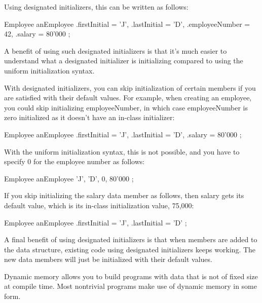 Using designated initializers, this can be written as follows:

\begin{cpp}
Employee anEmployee {
    .firstInitial = 'J',
    .lastInitial = 'D',
    .employeeNumber = 42,
    .salary = 80'000
};
\end{cpp}

A benefit of using such designated initializers is that it’s much easier to understand what a designated initializer is initializing compared to using the uniform initialization syntax.

With designated initializers, you can skip initialization of certain members if you are satisfied with their default values. For example, when creating an employee, you could skip initializing employeeNumber, in which case employeeNumber is zero initialized as it doesn’t have an in-class initializer:

\begin{cpp}
Employee anEmployee {
    .firstInitial = 'J',
    .lastInitial = 'D',
    .salary = 80'000
};
\end{cpp}

With the uniform initialization syntax, this is not possible, and you have to specify 0 for the employee number as follows:

\begin{cpp}
Employee anEmployee { 'J', 'D', 0, 80'000 };
\end{cpp}

If you skip initializing the salary data member as follows, then salary gets its default value, which is its in-class initialization value, 75,000:

\begin{cpp}
Employee anEmployee {
    .firstInitial = 'J',
    .lastInitial = 'D'
};
\end{cpp}

A final benefit of using designated initializers is that when members are added to the data structure, existing code using designated initializers keeps working. The new data members will just be initialized with their default values.


Dynamic memory allows you to build programs with data that is not of fixed size at compile time. Most nontrivial programs make use of dynamic memory in some form.



